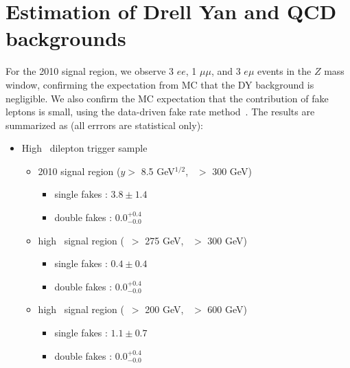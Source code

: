 \section{Estimation of Drell Yan and QCD backgrounds}
\label{sec:dyFR}

For the 2010 signal region, we observe 3 $ee$, 1 $\mu\mu$, and 3 $e\mu$ events in the $Z$ mass window,
confirming the expectation from MC that the DY background is negligible. We also confirm 
the MC expectation that the contribution of fake leptons is small, using the data-driven fake
rate method~\cite{ref:FR}. The results are summarized as (all errrors are statistical only):

\begin{itemize}
\item High \pt\ dilepton trigger sample
\begin{itemize}
\item 2010 signal region ($y >$ 8.5 GeV$^{1/2}$, \Ht\ $>$ 300 GeV)
   \begin{itemize} 
   \item single fakes : $3.8 \pm 1.4$
   \item double fakes : $0.0^{+0.4}_{-0.0}$
   \end{itemize}  
\item high \met\ signal region (\met\ $>$ 275 GeV, \Ht\ $>$ 300 GeV)
   \begin{itemize} 
   \item single fakes : $0.4 \pm 0.4$
   \item double fakes : $0.0^{+0.4}_{-0.0}$
   \end{itemize}  
\item high \Ht\ signal region (\met\ $>$ 200 GeV, \Ht\ $>$ 600 GeV)
   \begin{itemize} 
   \item single fakes : $1.1 \pm 0.7$
   \item double fakes : $0.0^{+0.4}_{-0.0}$
   \end{itemize}  
\end{itemize}

\clearpage


\end{itemize}
